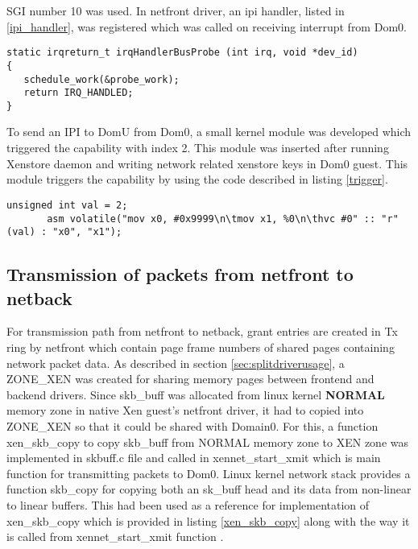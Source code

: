 SGI number 10 was used. In netfront driver, an ipi handler, listed in \ref{ipi_handler}, was registered which was called on receiving interrupt from Dom0.

\begin{lstlisting}[caption= IPI handler for receiving notification from Dom0 about successful running of Xenstore and netback driver ,label={ipi_handler}]
static irqreturn_t irqHandlerBusProbe (int irq, void *dev_id)
{
   schedule_work(&probe_work);
   return IRQ_HANDLED;
}

\end{lstlisting}
To send an IPI to DomU from Dom0, a small kernel module was developed which triggered the capability with index 2. This module was inserted after running Xenstore daemon and writing network related xenstore keys in Dom0 guest. This module triggers the capability by using the code described in listing \ref{trigger}.

\begin{lstlisting}[caption=Code to trigger capability 2 from Dom0 to DomU ,label={trigger}]
       unsigned int val = 2;
       asm volatile("mov x0, #0x9999\n\tmov x1, %0\n\thvc #0" :: "r" (val) : "x0", "x1");
\end{lstlisting}

\subsection{Transmission of packets from netfront to netback \label{sec:txnetfront}}
For transmission path from netfront to netback, grant entries are created in Tx ring by netfront which contain page frame numbers of shared pages containing network packet data. As described in section \ref{sec:splitdriverusage}, a ZONE\_XEN was created for sharing memory pages between frontend and backend drivers. Since skb\_buff was allocated from linux kernel \textbf{NORMAL} memory zone in native Xen guest's netfront driver, it had to copied into ZONE\_XEN so that it could be shared with Domain0. For this, a function xen\_skb\_copy to copy skb\_buff from NORMAL memory zone to XEN zone was implemented in skbuff.c file and called in xennet\_start\_xmit which is main function for transmitting packets to Dom0. Linux kernel network stack provides a function skb\_copy for copying both an sk\_buff head and its data from non-linear to linear buffers. This had been used as a reference for implementation of xen\_skb\_copy which is provided in listing \ref{xen_skb_copy} along with the way it is called from xennet\_start\_xmit function .

